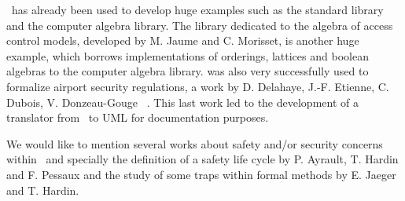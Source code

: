 \focal\ has already been used to develop huge examples such as  the
standard library and the computer algebra library. The library
dedicated to the algebra of access control models, developed by
M. Jaume and C. Morisset\cite{jias06,fcsarspa06,MorissetPhd}, 
 is   another huge example, which borrows implementations of orderings,
lattices and boolean algebras to the computer algebra library.
\focal{} was also very successfully used to formalize airport security
regulations, a work by D. Delahaye, J.-F. Etienne, C.  Dubois,
V. Donzeau-Gouge ~\cite{EDEMOI-All,EDEMOI-Model,EDEMOI-Proof}. This
last work led to the development of a translator\cite{Focal-UML}
from \focal\ to UML for documentation purposes. 

We would like to mention  several works about safety and/or security
concerns within \focal\  and specially the definition of a safety life
cycle by P. Ayrault, T. Hardin and F. Pessaux \cite{TTSS08} and the
study of some traps within formal methods by E. Jaeger and
T. Hardin\cite{traps}. 



